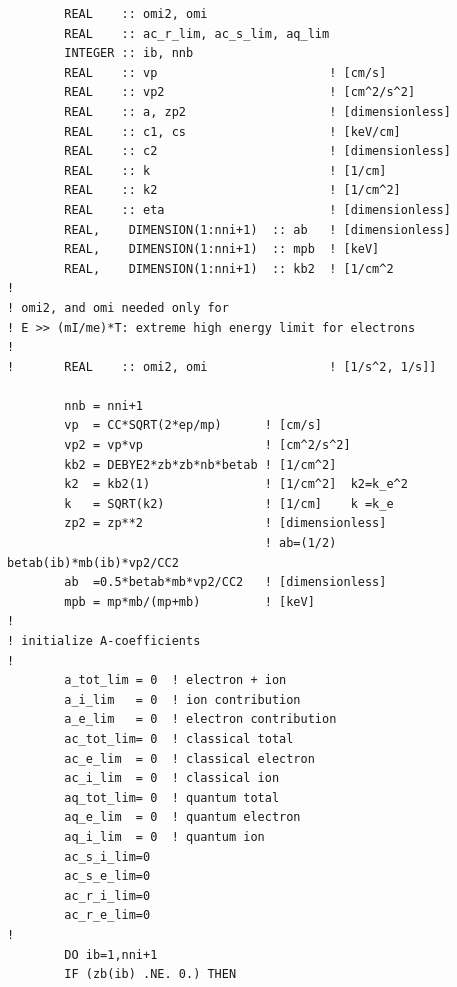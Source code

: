 \documentclass[preprint,12pt,eqsecnum,nofootinbib,amsmath,amssymb]{revtex4}
\begin{document}
{\begin{verbatim}
        REAL    :: omi2, omi
        REAL    :: ac_r_lim, ac_s_lim, aq_lim
        INTEGER :: ib, nnb
        REAL    :: vp                        ! [cm/s]
        REAL    :: vp2                       ! [cm^2/s^2]
        REAL    :: a, zp2                    ! [dimensionless]
        REAL    :: c1, cs                    ! [keV/cm]
        REAL    :: c2                        ! [dimensionless]
        REAL    :: k                         ! [1/cm]
        REAL    :: k2                        ! [1/cm^2]
        REAL    :: eta                       ! [dimensionless]
        REAL,    DIMENSION(1:nni+1)  :: ab   ! [dimensionless]
        REAL,    DIMENSION(1:nni+1)  :: mpb  ! [keV]
        REAL,    DIMENSION(1:nni+1)  :: kb2  ! [1/cm^2
!
! omi2, and omi needed only for 
! E >> (mI/me)*T: extreme high energy limit for electrons
!
!       REAL    :: omi2, omi                 ! [1/s^2, 1/s]]

        nnb = nni+1
        vp  = CC*SQRT(2*ep/mp)      ! [cm/s]
        vp2 = vp*vp                 ! [cm^2/s^2]
        kb2 = DEBYE2*zb*zb*nb*betab ! [1/cm^2]
        k2  = kb2(1)                ! [1/cm^2]  k2=k_e^2
        k   = SQRT(k2)              ! [1/cm]    k =k_e
        zp2 = zp**2                 ! [dimensionless]
                                    ! ab=(1/2) betab(ib)*mb(ib)*vp2/CC2
        ab  =0.5*betab*mb*vp2/CC2   ! [dimensionless] 
        mpb = mp*mb/(mp+mb)         ! [keV]
!
! initialize A-coefficients
!
        a_tot_lim = 0  ! electron + ion
        a_i_lim   = 0  ! ion contribution
        a_e_lim   = 0  ! electron contribution
        ac_tot_lim= 0  ! classical total
        ac_e_lim  = 0  ! classical electron
        ac_i_lim  = 0  ! classical ion
        aq_tot_lim= 0  ! quantum total
        aq_e_lim  = 0  ! quantum electron
        aq_i_lim  = 0  ! quantum ion
        ac_s_i_lim=0 
        ac_s_e_lim=0 
        ac_r_i_lim=0 
        ac_r_e_lim=0
!
        DO ib=1,nni+1
        IF (zb(ib) .NE. 0.) THEN


\end{verbatim}}
\end{document}

